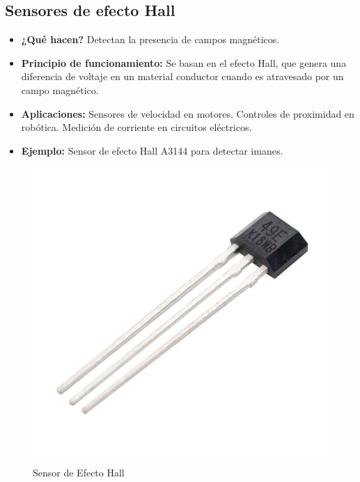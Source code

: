 \subsection*{Sensores de efecto Hall}
\begin{itemize}
	\item \textbf{¿Qué hacen?} Detectan la presencia de campos magnéticos.
	\item \textbf{Principio de funcionamiento:} Se basan en el efecto Hall, que genera una diferencia de voltaje en un material conductor cuando es atravesado por un campo magnético.
	\item \textbf{Aplicaciones:} Sensores de velocidad en motores.
	Controles de proximidad en robótica.
	Medición de corriente en circuitos eléctricos.
	\item \textbf{Ejemplo:} Sensor de efecto Hall A3144 para detectar imanes.
	\cite{carletti_sensores_2025}
\end{itemize}
\begin{figure}[h]
	\centering
	\includegraphics[width=0.2\linewidth]{img/sensor de efecto hall}
	\caption{Sensor de Efecto Hall}
	\label{fig:sensor de efecto hall}
\end{figure}


